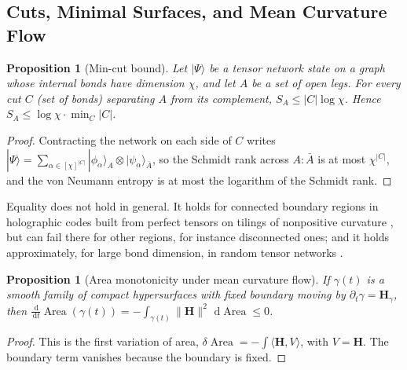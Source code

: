 \documentclass[11pt,a4paper,reqno]{amsart}
\newtheorem{proposition}[theorem]{Proposition}
\theoremstyle{definition}
\numberwithin{equation}{section}
\providecommand{\Area}{\operatorname{Area}}
\newcommand{\dif}{\,\mathrm{d}}
\begin{document}
\subsection{Cuts, Minimal Surfaces, and Mean Curvature Flow}

\begin{proposition}[Min-cut bound]
\label{prop:mincut}
Let $|\Psi\rangle$ be a tensor network state on a graph whose internal bonds have dimension $\chi$, and let $A$ be a set of open legs. For every cut $C$ (set of bonds) separating $A$ from its complement, $S_A \le |C|\log\chi$. Hence $S_A \le \log\chi \cdot \min_C |C|$.
\end{proposition}
\begin{proof}
Contracting the network on each side of $C$ writes $|\Psi\rangle = \sum_{\alpha \in [\chi]^{|C|}} |\phi_\alpha\rangle_A \otimes |\psi_\alpha\rangle_{\bar A}$, so the Schmidt rank across $A : \bar A$ is at most $\chi^{|C|}$, and the von Neumann entropy is at most the logarithm of the Schmidt rank.
\end{proof}

Equality does not hold in general. It holds for connected boundary regions in holographic codes built from perfect tensors on tilings of nonpositive curvature \cite{pastawski2015holographic}, but can fail there for other regions, for instance disconnected ones; and it holds approximately, for large bond dimension, in random tensor networks \cite{hayden2016random}.

\begin{proposition}[Area monotonicity under mean curvature flow]
\label{prop:mcf_area}
If $\gamma(t)$ is a smooth family of compact hypersurfaces with fixed boundary moving by $\partial_t \gamma = \mathbf{H}_\gamma$, then $\frac{\dif}{\dif t}\Area(\gamma(t)) = -\int_{\gamma(t)}\|\mathbf{H}\|^2\,\dif\Area \le 0$.
\end{proposition}
\begin{proof}
This is the first variation of area, $\delta\Area = -\int \langle \mathbf{H}, V\rangle$, with $V = \mathbf{H}$. The boundary term vanishes because the boundary is fixed.
\end{proof}
\end{document}
